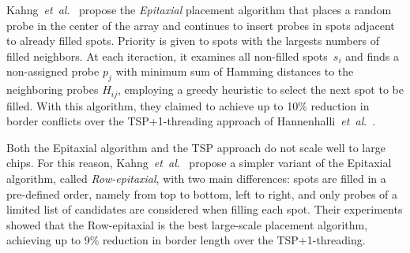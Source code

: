 \documentclass[runningheads]{llncs}
\newcommand{\ignore}[1]{}
\begin{document}
Kahng~{\it et~al}.~\cite{KAHNG02} propose the \emph{Epitaxial} placement algorithm that
places a random probe in the center of the array and continues to
insert probes in spots adjacent to already filled spots. Priority is given
to spots with the largests numbers of filled neighbors. At each iteraction,
it examines all non-filled spots~$s_i$ and finds a non-assigned probe
$p_j$ with minimum sum of Hamming distances to the neighboring probes
$H_{ij}$, employing a greedy heuristic to select the next spot to be filled.
With this algorithm, they claimed to
achieve up to 10\% reduction in border conflicts over the TSP+1-threading
approach of Hannenhalli~{\it et~al}.\ \cite{HANNENHALLI02}.

\ignore{
The major problem with the Epitaxial and the TSP-based algorithm is that they
have at least quadratic time complexity and thus are not scalable for the
latest million-probe microarrays. According to their experiments, the TSP
approach needed around 32 minutes to produce the layout of a 200\,x\,200
chip, whereas the Epitaxial algorithm needed 74 minutes on average. For a
500\,x\,500 chip, the TSP took over 30 hours to complete, whereas the
Epitaxial algorithm did not complete ``due to prohibitively large running
time or memory requirements'' \cite{KAHNG02}.
}

\ignore{
This observation has led to the development of two new algorithms by
\cite{KAHNG03A}. The first one, called Sliding-window Matching (SWM), is not
exactly a placement algorithm as it iteratively improves an initial placement
that can be constructed by, for instance, TSP and 1-threading. Improvements
are achieved by selecting an independent set of spots inside the window and
optimally replacing their probes using a minimum-weight perfect matching
algorithm. The term independent refers to probes that can be replaced without
affecting the border length of the other selected probes.
}

Both the Epitaxial algorithm and the TSP approach do not scale well to large
chips.  For this reason, Kahng~{\it et~al}.~\cite{KAHNG03A} propose a simpler variant
of the Epitaxial algorithm, called \emph{Row-epitaxial}, with two main
differences: spots are filled in a pre-defined order, namely
from top to bottom, left to right, and only probes of a limited list of candidates are
considered when filling each spot. Their experiments showed
that the Row-epitaxial is the best large-scale placement algorithm,
achieving up to 9\% reduction in border length over the TSP+1-threading.
\end{document}

